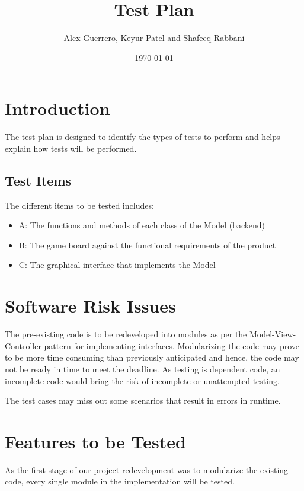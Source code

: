 \documentclass[12pt]{article}
\begin{document}
\title{Test Plan} 
\author{Alex Guerrero, Keyur Patel and Shafeeq Rabbani}
\date{\today}

\maketitle

\tableofcontents
\newpage
%
%

\section{Introduction}
The test plan is designed to identify the types of tests to perform and helps explain how tests will be performed.

\subsection{Test Items}
The different items to be tested includes:

\begin{itemize}
\item A: The functions and methods of each class of the Model (backend)
\item B: The game board against the functional requirements of the product
\item C: The graphical interface that implements the Model 
\end{itemize}

\section{Software Risk Issues}
The pre-existing code is to be redeveloped into modules as per the Model-View-Controller pattern for implementing interfaces. Modularizing the code may prove to be more time consuming than previously anticipated and hence, the code may not be ready in time to meet the deadline. As testing is dependent code, an incomplete code would bring the risk of incomplete or unattempted testing.

The test cases may miss out some scenarios that result in errors in runtime.
\section{Features to be Tested}
As the first stage of our project redevelopment was to modularize the existing code, every single module in the implementation will be tested.
\end{document}
